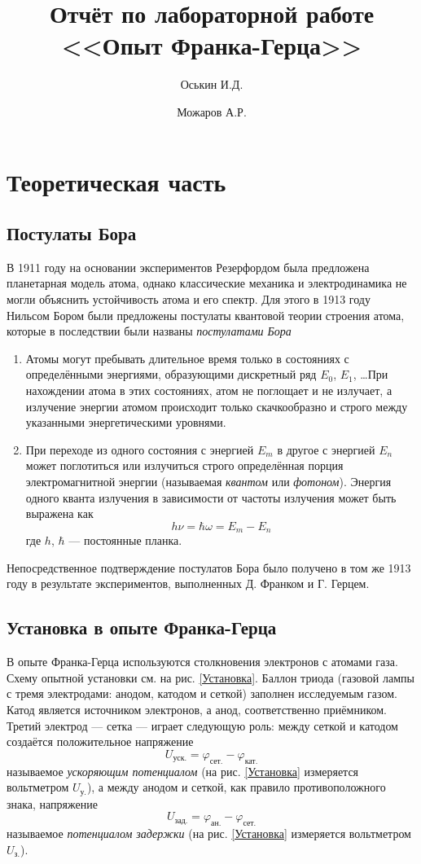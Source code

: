 \documentclass[a4paper]{article}
\title{Отчёт по лабораторной работе\\<<Опыт Франка-Герца>>}
\author{Оськин И.Д. \and Можаров А.Р.}
\begin{document}
\maketitle

\section*{\centering Теоретическая часть}

\subsection*{Постулаты Бора}

В 1911 году на основании экспериментов Резерфордом была предложена планетарная модель атома,
однако классические механика и электродинамика не могли объяснить устойчивость атома
и его спектр. Для этого в 1913 году Нильсом Бором были предложены постулаты
квантовой теории строения атома, которые в последствии были названы {\it постулатами Бора}
\begin{enumerate}
    \item Атомы могут пребывать длительное время только в состояниях с определёнными энергиями,
    образующими дискретный ряд $E_0$, $E_1$, \ldots При нахождении атома в этих состояниях, атом не поглощает
    и не излучает, а излучение энергии атомом происходит только скачкообразно и строго между
    указанными энергетическими уровнями.
    \item При переходе из одного состояния с энергией $E_m$ в другое с энергией $E_n$
    может поглотиться или излучиться строго определённая порция электромагнитной энергии
    (называемая {\it квантом} или {\it фотоном}). Энергия одного кванта излучения
    в зависимости от частоты излучения может быть выражена как
    $$
        h\nu = \hbar\omega = E_m - E_n
    $$
    где $h$, $\hbar$ --- постоянные планка.
\end{enumerate}
Непосредственное подтверждение постулатов Бора было получено в том же 1913 году
в результате экспериментов, выполненных Д. Франком и Г. Герцем.

\subsection*{Установка в опыте Франка-Герца}

В опыте Франка-Герца используются столкновения электронов с атомами газа.
Схему опытной установки см. на рис. \ref{Установка}.
Баллон триода (газовой лампы с тремя электродами: анодом, катодом и сеткой)
заполнен исследуемым газом. Катод является источником электронов,
а анод, соответственно приёмником. Третий электрод --- сетка --- играет следующую роль:
между сеткой и катодом создаётся положительное напряжение
$$
    U_\text{уск.} = \varphi_\text{сет.} - \varphi_\text{кат.}
$$
называемое {\it ускоряющим потенциалом} (на рис. \ref{Установка} измеряется вольтметром $U_\text{у.}$),
а между анодом и сеткой, как правило противоположного знака, напряжение
$$
    U_\text{зад.} = \varphi_\text{ан.} - \varphi_\text{сет.}
$$
называемое {\it потенциалом задержки} (на рис. \ref{Установка} измеряется вольтметром $U_\text{з.}$).
\end{document}
